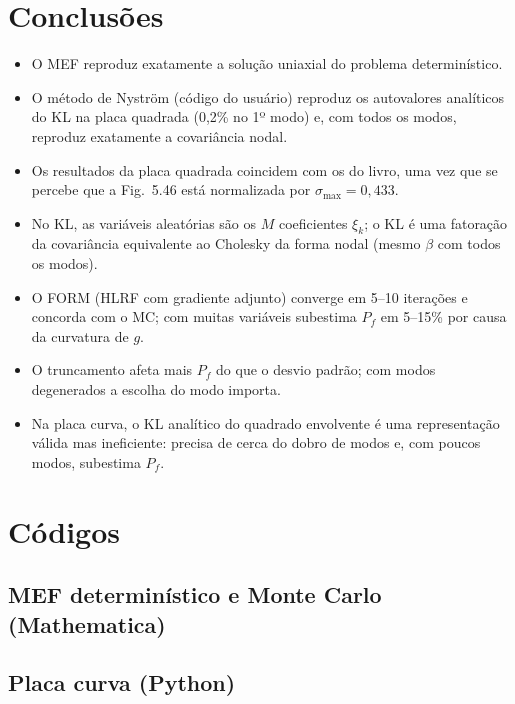 \documentclass[11pt,a4paper]{article}
\begin{document}
\section{Conclusões}
\begin{itemize}
  \item O MEF reproduz exatamente a solução uniaxial do problema determinístico.
  \item O método de Nyström (código do usuário) reproduz os autovalores analíticos do KL na placa quadrada (0,2\% no 1º modo) e, com todos os modos, reproduz exatamente a covariância nodal.
  \item Os resultados da placa quadrada coincidem com os do livro, uma vez que se percebe que a Fig.~5.46 está normalizada por $\sigma_{\max}=0{,}433$.
  \item No KL, as variáveis aleatórias são os $M$ coeficientes $\xi_k$; o KL é uma fatoração da covariância equivalente ao Cholesky da forma nodal (mesmo $\beta$ com todos os modos).
  \item O FORM (HLRF com gradiente adjunto) converge em 5--10 iterações e concorda com o MC; com muitas variáveis subestima $P_f$ em 5--15\% por causa da curvatura de $g$.
  \item O truncamento afeta mais $P_f$ do que o desvio padrão; com modos degenerados a escolha do modo importa.
  \item Na placa curva, o KL analítico do quadrado envolvente é uma representação válida mas ineficiente: precisa de cerca do dobro de modos e, com poucos modos, subestima $P_f$.
\end{itemize}

\appendix
\section{Códigos}
\subsection{MEF determinístico e Monte Carlo (Mathematica)}







\subsection{Placa curva (Python)}

\end{document}

